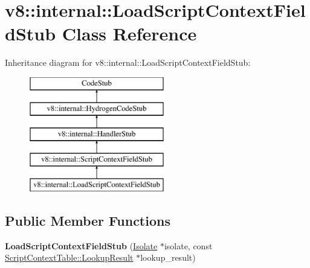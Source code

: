 \hypertarget{classv8_1_1internal_1_1_load_script_context_field_stub}{}\section{v8\+:\+:internal\+:\+:Load\+Script\+Context\+Field\+Stub Class Reference}
\label{classv8_1_1internal_1_1_load_script_context_field_stub}
Inheritance diagram for v8\+:\+:internal\+:\+:Load\+Script\+Context\+Field\+Stub\+:\begin{figure}[H]
\begin{center}
\leavevmode
\includegraphics[height=5.000000cm]{classv8_1_1internal_1_1_load_script_context_field_stub}
\end{center}
\end{figure}
\subsection*{Public Member Functions}
\begin{DoxyCompactItemize}
\item 
{\bfseries Load\+Script\+Context\+Field\+Stub} (\hyperlink{classv8_1_1internal_1_1_isolate}{Isolate} $\ast$isolate, const \hyperlink{structv8_1_1internal_1_1_script_context_table_1_1_lookup_result}{Script\+Context\+Table\+::\+Lookup\+Result} $\ast$lookup\+\_\+result)\hypertarget{classv8_1_1internal_1_1_load_script_context_field_stub_a23d251586b52602635e972ce0cc59a70}{}\label{classv8_1_1internal_1_1_load_script_context_field_stub_a23d251586b52602635e972ce0cc59a70}

\end{DoxyCompactItemize}
